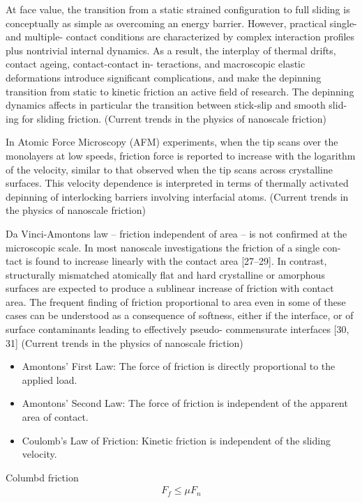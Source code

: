 At face value, the transition from a static strained configuration to full sliding is conceptually as simple as overcoming an energy barrier. However, practical single- and multiple- contact conditions are characterized by complex interaction profiles plus nontrivial internal dynamics. As a result, the interplay of thermal drifts, contact ageing, contact-contact in- teractions, and macroscopic elastic deformations introduce significant complications, and make the depinning transition from static to kinetic friction an active field of research. The depinning dynamics affects in particular the transition between stick-slip and smooth slid- ing for sliding friction. (Current trends in the physics of nanoscale friction)

In Atomic Force Microscopy (AFM) experiments, when the tip scans over the monolayers at low speeds, friction force is reported to increase with the logarithm of the velocity, similar to that observed when the tip scans across crystalline surfaces. This velocity dependence is interpreted in terms of thermally activated depinning of interlocking barriers involving interfacial atoms. (Current trends in the physics of nanoscale friction)

Da Vinci-Amontons law – friction independent of area – is not confirmed at the microscopic scale. In most nanoscale investigations the friction of a single con- tact is found to increase linearly with the contact area [27–29]. In contrast, structurally mismatched atomically flat and hard crystalline or amorphous surfaces are expected to produce a sublinear increase of friction with contact area. The frequent finding of friction proportional to area even in some of these cases can be understood as a consequence of softness, either if the interface, or of surface contaminants leading to effectively pseudo- commensurate interfaces [30, 31] (Current trends in the physics of nanoscale friction)


\begin{itemize}
    \item Amontons' First Law: The force of friction is directly proportional to the applied load.
    \item Amontons' Second Law: The force of friction is independent of the apparent area of contact.
    \item Coulomb's Law of Friction: Kinetic friction is independent of the sliding velocity.
\end{itemize}
Columbd friction 
\begin{align*}
    F_f \le \mu F_n
\end{align*}


